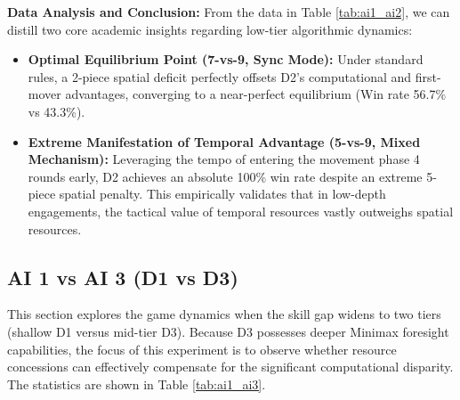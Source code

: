 \textbf{Data Analysis and Conclusion:} 
From the data in Table \ref{tab:ai1_ai2}, we can distill two core academic insights regarding low-tier algorithmic dynamics:
\begin{itemize}
    \item \textbf{Optimal Equilibrium Point (7-vs-9, Sync Mode):} Under standard rules, a 2-piece spatial deficit perfectly offsets D2's computational and first-mover advantages, converging to a near-perfect equilibrium (Win rate 56.7\% vs 43.3\%).
    \item \textbf{Extreme Manifestation of Temporal Advantage (5-vs-9, Mixed Mechanism):} Leveraging the tempo of entering the movement phase 4 rounds early, D2 achieves an absolute 100\% win rate despite an extreme 5-piece spatial penalty. This empirically validates that in low-depth engagements, the tactical value of temporal resources vastly outweighs spatial resources.
\end{itemize}

\subsection{AI 1 vs AI 3 (D1 vs D3)}
\label{subsec:ai1_ai3}

This section explores the game dynamics when the skill gap widens to two tiers (shallow D1 versus mid-tier D3). Because D3 possesses deeper Minimax foresight capabilities, the focus of this experiment is to observe whether resource concessions can effectively compensate for the significant computational disparity. The statistics are shown in Table \ref{tab:ai1_ai3}.

\begin{table}[htbp]
    \centering
    \caption{AI 1 vs AI 3 Simulation Data Distribution (Sample Size=1000)}
    \label{tab:ai1_ai3}
\end{table}

